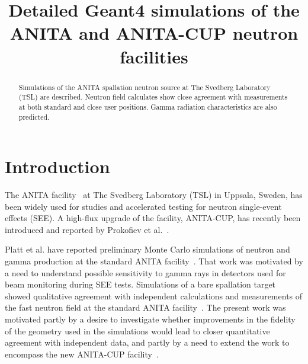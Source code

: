 \documentclass[peerreviewca,11pt,a4paper]{IEEEtran}
\begin{document}
\title{
    Detailed Geant4 simulations of the ANITA and ANITA-CUP neutron facilities
}

\author{
}

\maketitle

\begin{abstract}
    Simulations of the ANITA spallation neutron source at The Svedberg Laboratory (TSL) are described.
    Neutron field calculates show close agreement with measurements at both standard and close user positions.
    Gamma radiation characteristics are also predicted.
\end{abstract}

\IEEEpeerreviewmaketitle

\section{Introduction}

The ANITA facility~\cite{Prokofiev2009} at The Svedberg Laboratory (TSL) in Uppsala, Sweden, has been widely used for studies and accelerated testing for neutron single-event effects (SEE).
A high-flux upgrade of the facility, ANITA-CUP, has recently been introduced and reported by Prokofiev et al.~\cite{Prokofiev2014}.

Platt et al. have reported preliminary Monte Carlo simulations of neutron and gamma production at the standard ANITA facility~\cite{Platt2013}.
That work was motivated by a need to understand possible sensitivity to gamma rays in detectors used for beam monitoring during SEE tests.
Simulations of a bare spallation target showed qualitative agreement with independent calculations and measurements of the fast neutron field at the standard ANITA facility~\cite{Prokofiev2009}.
The present work was motivated partly by a desire to investigate whether improvements in the fidelity of the geometry used in the simulations would lead to closer quantitative agreement with independent data, and partly by a need to extend the work to encompass the new ANITA-CUP facility~\cite{Prokofiev2014}.
\end{document}
